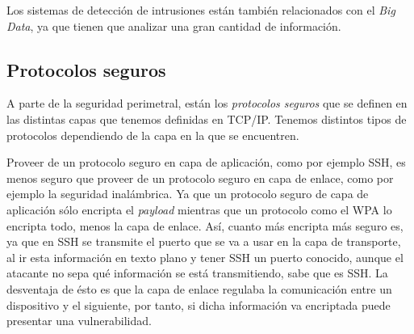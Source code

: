 \documentclass[10pt,a4paper,spanish]{report}
\begin{document}
Los sistemas de detección de intrusiones están también relacionados con el \textit{\textcolor{tema2}{Big Data}}, ya que tienen que analizar una gran cantidad de información. 

\subsection{\textcolor{tema2}Protocolos seguros}
A parte de la seguridad perimetral, están los \textit{\textcolor{tema2}{protocolos seguros}} que se definen en las distintas capas que tenemos definidas en TCP/IP. Tenemos distintos tipos de protocolos dependiendo de la capa en la que se encuentren. 

Proveer de un protocolo seguro en capa de aplicación, como por ejemplo SSH, es menos seguro que proveer de un protocolo seguro en capa de enlace, como por ejemplo la seguridad inalámbrica. Ya que un protocolo seguro de capa de aplicación sólo encripta el \textit{\textcolor{tema2}{payload}} mientras que un protocolo como el WPA lo encripta todo, menos la capa de enlace. Así, cuanto más encripta más seguro es, ya que en SSH se transmite el puerto que se va a usar en la capa de transporte, al ir esta información en texto plano y tener SSH un puerto conocido, aunque el atacante no sepa qué información se está transmitiendo, sabe que es SSH. La desventaja de ésto es que la capa de enlace regulaba la comunicación entre un dispositivo y el siguiente, por tanto, si dicha información va encriptada puede presentar una vulnerabilidad.
\end{document}
